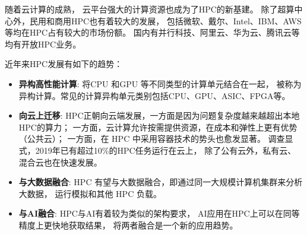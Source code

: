 随着云计算的成熟，
云平台强大的计算资源也成为了HPC的新基建。
除了超算中心外，民用和商用HPC也有着较大的发展，
包括微软、戴尔、Intel、IBM、AWS等均在HPC占有较大的市场份额。
国内有并行科技、阿里云、华为云、腾讯云等均有开放HPC业务。

近年来HPC发展有如下的趋势：

\begin{itemize}
    \item \textbf{异构高性能计算}: 将CPU 和GPU 等不同类型的计算单元结合在一起，
    被称为异构计算。常见的计算异构单元类别包括CPU、GPU、ASIC、FPGA等。 
    \item \textbf{向云上迁移}: HPC正朝向云端发展，一方面是因为问题复杂度越来越超出本地HPC的算力； 
    一方面，云计算允许按需提供资源，在成本和弹性上更有优势（公共云）；
    一方面，在 HPC 中采用容器技术的势头也愈发显著\cite{redhat_hpc,oracle_hpc}。 
    调查显式，2019年已有超过10\%的HPC任务运行在云上，
    除了公有云外，私有云、混合云也在快速发展\cite{hpc_rearch_2019}。
    \item \textbf{与大数据融合}: HPC 有望与大数据融合，即通过同一大规模计算机集群来分析大数据，
    运行模拟和其他 HPC 负载\cite{oracle_hpc,yef2022_hpc}。
    \item \textbf{与AI融合}: HPC与AI有着较为类似的架构要求，
    AI应用在HPC上可以在同等精度上更快地获取结果，
    将两者融合是一个新的应用趋势\cite{hpc_ai_intel,farber2017ai,yef2022_hpc,jack_hpc_ai}。
\end{itemize}